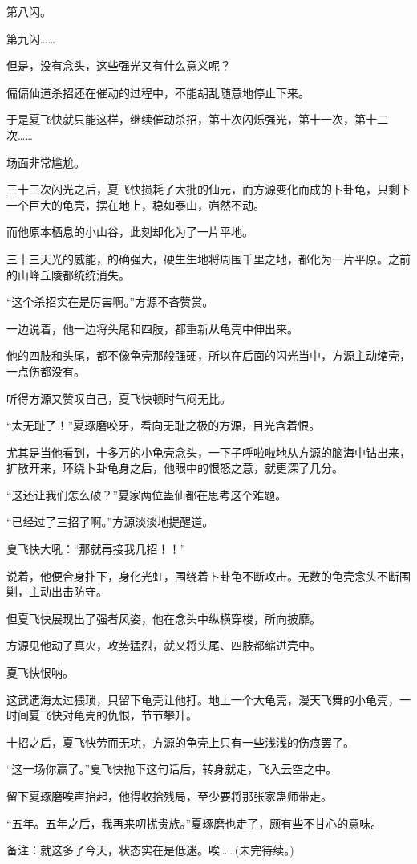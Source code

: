 \begin{this_body}
第八闪。

第九闪……

但是，没有念头，这些强光又有什么意义呢？

偏偏仙道杀招还在催动的过程中，不能胡乱随意地停止下来。

于是夏飞快就只能这样，继续催动杀招，第十次闪烁强光，第十一次，第十二次……

场面非常尴尬。

三十三次闪光之后，夏飞快损耗了大批的仙元，而方源变化而成的卜卦龟，只剩下一个巨大的龟壳，摆在地上，稳如泰山，岿然不动。

而他原本栖息的小山谷，此刻却化为了一片平地。

三十三天光的威能，的确强大，硬生生地将周围千里之地，都化为一片平原。之前的山峰丘陵都统统消失。

“这个杀招实在是厉害啊。”方源不吝赞赏。

一边说着，他一边将头尾和四肢，都重新从龟壳中伸出来。

他的四肢和头尾，都不像龟壳那般强硬，所以在后面的闪光当中，方源主动缩壳，一点伤都没有。

听得方源又赞叹自己，夏飞快顿时气闷无比。

“太无耻了！”夏琢磨咬牙，看向无耻之极的方源，目光含着恨。

尤其是当他看到，十多万的小龟壳念头，一下子呼啦啦地从方源的脑海中钻出来，扩散开来，环绕卜卦龟身之后，他眼中的恨怒之意，就更深了几分。

“这还让我们怎么破？”夏家两位蛊仙都在思考这个难题。

“已经过了三招了啊。”方源淡淡地提醒道。

夏飞快大吼：“那就再接我几招！！”

说着，他便合身扑下，身化光虹，围绕着卜卦龟不断攻击。无数的龟壳念头不断围剿，主动出击防守。

但夏飞快展现出了强者风姿，他在念头中纵横穿梭，所向披靡。

方源见他动了真火，攻势猛烈，就又将头尾、四肢都缩进壳中。

夏飞快恨呐。

这武遗海太过猥琐，只留下龟壳让他打。地上一个大龟壳，漫天飞舞的小龟壳，一时间夏飞快对龟壳的仇恨，节节攀升。

十招之后，夏飞快劳而无功，方源的龟壳上只有一些浅浅的伤痕罢了。

“这一场你赢了。”夏飞快抛下这句话后，转身就走，飞入云空之中。

留下夏琢磨唉声抬起，他得收拾残局，至少要将那张家蛊师带走。

“五年。五年之后，我再来叨扰贵族。”夏琢磨也走了，颇有些不甘心的意味。

备注：就这多了今天，状态实在是低迷。唉……(未完待续。)

\end{this_body}

